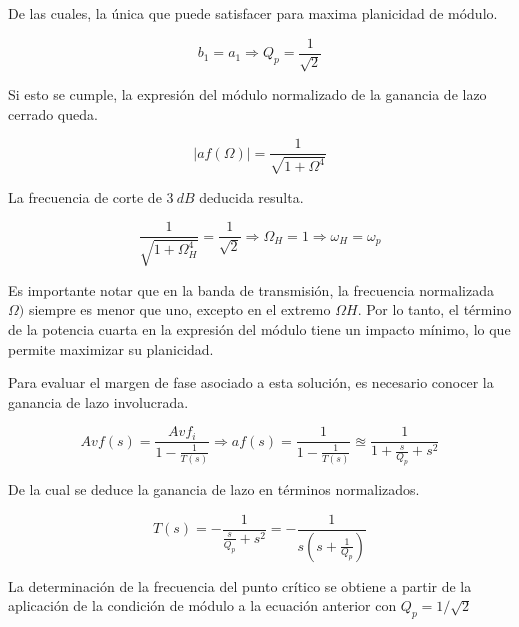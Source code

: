 \documentclass[12pt,A4paper,titlepage]{article}
\begin{document}
\bigskip
\hspace{1mm} De las cuales, la única que puede satisfacer para maxima planicidad de módulo.

\begin{equation}
    b_1 = a_1 \Longrightarrow Q_p = \frac{1}{\sqrt{2}}
\end{equation}

\bigskip
\hspace{1mm} Si esto se cumple, la expresión del módulo normalizado de la ganancia de lazo cerrado queda.

\begin{equation}
    |af(\Omega)| = \frac{1}{\sqrt{1 + \Omega ^4}}
\end{equation}

\bigskip
\hspace{1mm} La frecuencia de corte de \(3~dB\) deducida resulta.

\begin{equation}
    \frac{1}{\sqrt{1 + \Omega _H ^4}} = \frac{1}{\sqrt{2}} \Longrightarrow \Omega _H = 1 \Longrightarrow \omega _H = \omega _p
\end{equation}

\bigskip
\hspace{1mm} Es importante notar que en la banda de transmisión, la frecuencia normalizada \( \Omega )\) siempre es menor que uno, excepto en el extremo \( \Omega H \). Por lo tanto, el término de la potencia cuarta en la expresión del módulo tiene un impacto mínimo, lo que permite maximizar su planicidad.

\hspace{1mm} Para evaluar el margen de fase asociado a esta solución, es necesario conocer la ganancia de lazo involucrada.

\begin{equation}
    Avf (s) = \frac{Avf_i}{1 - \frac{1}{T(s)}} \Longrightarrow af(s) = \frac{1}{1 - \frac{1}{T(s)}} \approxeq \frac{1}{1 + \frac{s}{Q_p} + s^2}
\end{equation}

\bigskip
\hspace{1mm} De la cual se deduce la ganancia de lazo en términos normalizados.

\begin{equation}
    T(s) = - \frac{1}{\frac{s}{Q_p} + s^2} = - \frac{1}{s (s + \frac{1}{Q_p})}
\end{equation}

\bigskip
\hspace{1mm} La determinación de la frecuencia del punto crítico se obtiene a partir de la aplicación de la condición de módulo a la ecuación anterior con \( Q_p = 1/\sqrt{2} \)
\end{document}
